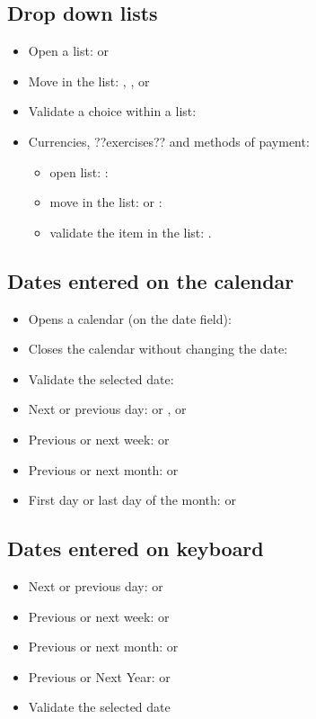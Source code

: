 \subsection{Drop down lists}
\begin{itemize}
\item Open a list:  or 
\item Move in the list: , ,  or 
\item Validate a choice within a list: 
\item Currencies, ??exercises?? and methods of payment:
\begin{itemize}
\item open list: : 
\item move in the list:  or :
\item validate the item in the list: .
\end{itemize}
\end{itemize}


\subsection{Dates entered on the calendar}

\begin{itemize}
\item Opens a calendar (on the date field): 
\item Closes the calendar without changing the date: 
\item Validate the selected date: 
\item Next or previous day: \key{+} or \key{-},  or 
\item Previous or next week:  or 
\item Previous or next month:  or 
\item First day or last day of the month:  or 
\end{itemize}


\subsection{Dates entered on keyboard }

\begin{itemize}
\item Next or previous day: \key{+} or \key{-}
\item Previous or next week:  \key{+} or  \key{-}
\item Previous or next month:  or 
\item Previous or Next Year:   or  
\item Validate the selected date 
\end{itemize}


